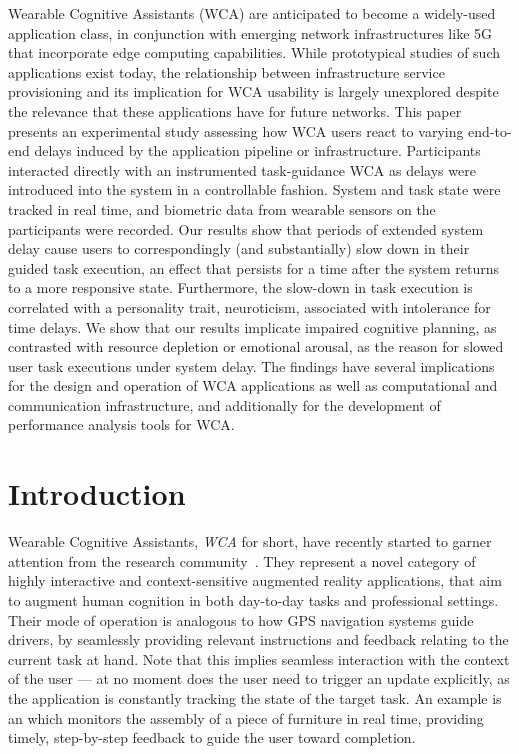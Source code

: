 \documentclass[10pt,letterpaper]{article}
\begin{document}
Wearable Cognitive Assistants (WCA) are anticipated to become a widely-used application class, in conjunction with emerging network infrastructures like 5G that incorporate edge computing capabilities.
While prototypical studies of such applications exist today, the relationship between infrastructure service provisioning and its implication for WCA usability is largely unexplored despite the relevance that these applications have for future networks.
This paper presents an experimental study assessing how WCA users react to varying end-to-end delays induced by the application pipeline or infrastructure.
Participants interacted directly with an instrumented task-guidance WCA as delays were introduced into the system in a controllable fashion.
System and task state were tracked in real time, and biometric data from wearable sensors on the participants were recorded.
Our results show that periods of extended system delay cause users to correspondingly (and substantially) slow down in their guided task execution, an effect that persists for a time after the system returns to a more responsive state.
Furthermore, the slow-down in task execution is correlated with a personality trait, neuroticism, associated with intolerance for time delays.
We show that our results implicate impaired cognitive planning, as contrasted with resource depletion or emotional arousal, as the reason for slowed user task executions under system delay.
The findings have several implications for the design and operation of WCA applications as well as computational and communication infrastructure, and additionally for the development of performance analysis tools for WCA.\@


\linenumbers%
\section{Introduction}

Wearable Cognitive Assistants, \emph{WCA} for short, have recently started to garner attention from the research community~\autocite{Ha:TowardsWearableCogAssist,Chen:EarlyImplementation}.
They represent a novel category of highly interactive and context-sensitive augmented reality applications, that aim to augment human cognition in both day-to-day tasks and professional settings.
Their mode of operation is analogous to how GPS navigation systems guide drivers, by seamlessly providing relevant instructions and feedback relating to the current task at hand.
Note that this implies seamless interaction with the context of the user --- at no moment does the user need to trigger an update explicitly, as the application is constantly tracking the state of the target task.
An example is an \textcite{IKEAAssistant} which monitors the assembly of a piece of furniture in real time, providing timely, step-by-step feedback to guide the user toward completion.
\end{document}
